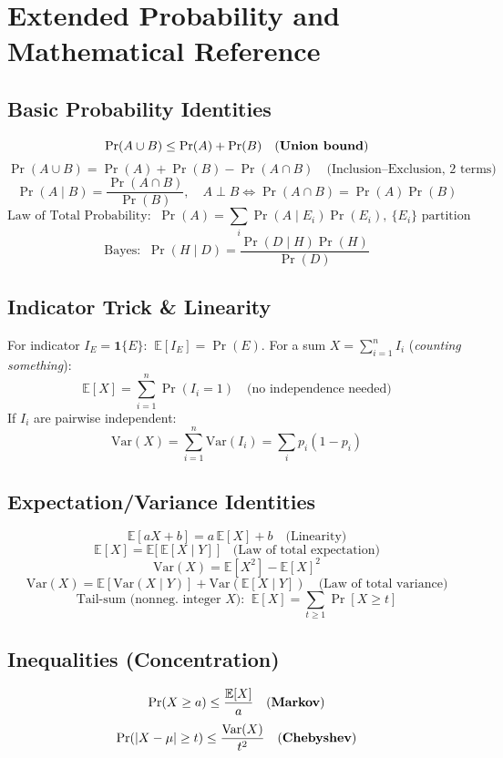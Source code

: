 \documentclass[10pt]{article}
\theoremstyle{definition}
\begin{document}
\bigskip




\clearpage

\section{Extended Probability and Mathematical Reference}\label{app:formulas}
\subsection{Basic Probability Identities}
\[
\Pr(A\cup B)\le \Pr(A)+\Pr(B)\quad\text{(\textbf{Union bound})}
\]
\[
\Pr(A\cup B)=\Pr(A)+\Pr(B)-\Pr(A\cap B)\quad\text{(Inclusion--Exclusion, 2 terms)}
\]
\[
\Pr(A\mid B)=\frac{\Pr(A\cap B)}{\Pr(B)},\quad A\perp B\iff \Pr(A\cap B)=\Pr(A)\Pr(B)
\]
\[
\text{Law of Total Probability: }\ \Pr(A)=\sum_i \Pr(A\mid E_i)\Pr(E_i),\ \{E_i\}\text{ partition}
\]
\[
\text{Bayes: }\ \Pr(H\mid D)=\frac{\Pr(D\mid H)\Pr(H)}{\Pr(D)}
\]

\subsection{Indicator Trick \& Linearity}
For indicator $I_E=\mathbf{1}\{E\}$: $\ \mathbb{E}[I_E]=\Pr(E)$.
For a sum $X=\sum_{i=1}^n I_i$ (\emph{counting something}):
\[
\mathbb{E}[X]=\sum_{i=1}^n \Pr(I_i=1)\quad\text{(no independence needed)}
\]
If $I_i$ are pairwise independent: 
\[
\mathrm{Var}(X)=\sum_{i=1}^n \mathrm{Var}(I_i)=\sum_i p_i(1-p_i)
\]

\subsection{Expectation/Variance Identities}
\[
\mathbb{E}[aX+b]=a\,\mathbb{E}[X]+b\quad\text{(Linearity)}
\]
\[
\mathbb{E}[X]=\mathbb{E}\big[\ \mathbb{E}[X\mid Y]\ \big]\quad\text{(Law of total expectation)}
\]
\[
\mathrm{Var}(X)=\mathbb{E}[X^2]-\mathbb{E}[X]^2
\]
\[
\mathrm{Var}(X)=\mathbb{E}\!\left[\mathrm{Var}(X\mid Y)\right]+\mathrm{Var}\!\left(\mathbb{E}[X\mid Y]\right)\quad\text{(Law of total variance)}
\]
\[
\text{Tail-sum (nonneg. integer $X$): }\ \mathbb{E}[X]=\sum_{t\ge1}\Pr[X\ge t]
\]

\subsection{Inequalities (Concentration)}
\[
\Pr(X\ge a)\le \frac{\mathbb{E}[X]}{a}\quad\text{(\textbf{Markov})}
\]
\[
\Pr(|X-\mu|\ge t)\le \frac{\mathrm{Var}(X)}{t^2}\quad\text{(\textbf{Chebyshev})}
\]
\end{document}
